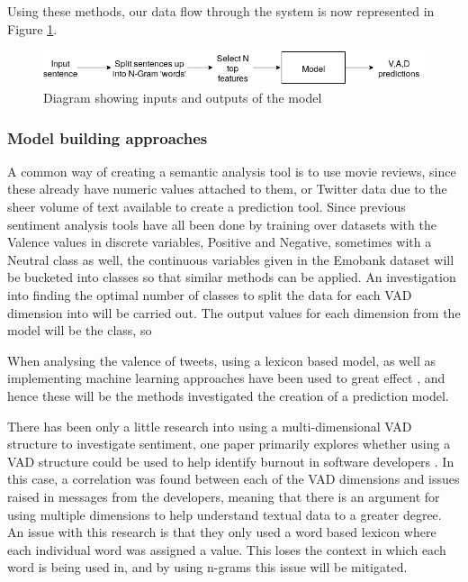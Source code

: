 Using these methods, our data flow through the system is now represented in Figure \ref{model:flow}.

\begin{figure}[h]
\centering
\includegraphics[scale=0.5]{litImgs/modelFlow.png}
\caption{Diagram showing inputs and outputs of the model}
\label{model:flow}
\end{figure}


\subsubsection{Model building approaches}

A common way of creating a semantic analysis tool is to use movie reviews, since these already have numeric values attached to them, or Twitter data due to the sheer volume of text available to create a prediction tool. Since previous sentiment analysis tools have all been done by training over datasets with the Valence values in discrete variables, Positive and Negative, sometimes with a Neutral class as well, the continuous variables given in the Emobank dataset will be bucketed into classes so that similar methods can be applied. An investigation into finding the optimal number of classes to split the data for each VAD dimension into will be carried out.
The output values for each dimension from the model will be the class, so 

When analysing the valence of tweets, using a lexicon based model, as well as implementing machine learning approaches have been used to great effect \cite{kolchyna2015twitter}, and hence these will be the methods investigated the creation of a prediction model.

There has been only a little research into using a multi-dimensional VAD structure to investigate sentiment, one paper primarily explores whether using a VAD structure could be used to help identify burnout in software developers \cite{mantyla2016mining}. In this case, a correlation was found between each of the VAD dimensions and issues raised in messages from the developers, meaning that there is an argument for using multiple dimensions to help understand textual data to a greater degree. An issue with this research is that they only used a word based lexicon where each individual word was assigned a value. This loses the context in which each word is being used in, and by using n-grams this issue will be mitigated.

